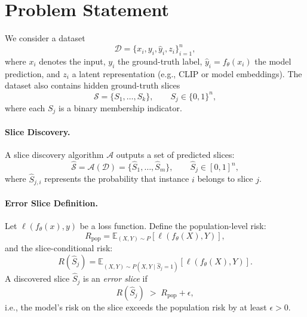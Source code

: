 \section{Problem Statement}

We consider a dataset 
\[
\mathcal{D} = \{x_i, y_i, \hat{y}_i, z_i\}_{i=1}^n,
\]
where $x_i$ denotes the input, $y_i$ the ground-truth label, 
$\hat{y}_i = f_\theta(x_i)$ the model prediction, and 
$z_i$ a latent representation (e.g., CLIP or model embeddings).
The dataset also contains hidden ground-truth slices
\[
\mathcal{S} = \{S_1, \dots, S_k\}, \qquad S_j \in \{0,1\}^n,
\]
where each $S_j$ is a binary membership indicator.

\paragraph{Slice Discovery.}
A slice discovery algorithm $\mathcal{A}$ outputs a set of predicted slices:
\[
\hat{\mathcal{S}} = \mathcal{A}(\mathcal{D})
= \{\hat{S}_1, \dots, \hat{S}_m\}, \qquad \hat{S}_j \in [0,1]^n,
\]
where $\hat{S}_{j,i}$ represents the probability that instance $i$ belongs
to slice $j$.

\paragraph{Error Slice Definition.}
Let $\ell(f_\theta(x), y)$ be a loss function.
Define the population-level risk:
\[
R_{\text{pop}} = \mathbb{E}_{(X,Y)\sim P}[\ell(f_\theta(X),Y)],
\]
and the slice-conditional risk:
\[
R(\hat{S}_j)
= \mathbb{E}_{(X,Y)\sim P(X,Y \mid \hat{S}_j = 1)}[\ell(f_\theta(X),Y)].
\]
A discovered slice $\hat{S}_j$ is an \emph{error slice} if
\[
R(\hat{S}_j)
\;>\;
R_{\text{pop}} + \epsilon,
\]
i.e., the model's risk on the slice exceeds the population risk by at least $\epsilon > 0$.

\newpage